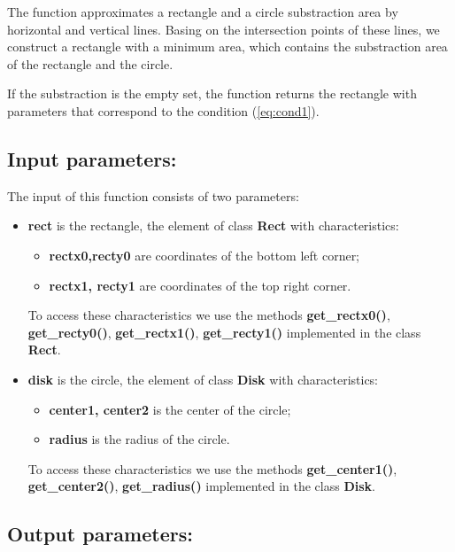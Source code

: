 \documentclass{report}
\begin{document}
The function approximates a rectangle and a circle substraction area by horizontal and vertical lines. Basing on the intersection points of these lines, we construct a rectangle with a minimum area, which contains the substraction area of the rectangle and the circle.

If the substraction is the empty set, the function returns the rectangle with parameters that correspond to the condition (\ref{eq:cond1}).

\subsection*{Input parameters:}

The input of this function consists of two parameters:

\begin{itemize}
	\item {\bfseries	rect} is the rectangle, the element of class {\bfseries Rect} with characteristics:
	\begin{itemize}
		\item {\bfseries rectx0,recty0} are coordinates of the bottom left corner;
		\item {\bfseries rectx1, recty1} are coordinates of the top right corner.
	\end{itemize}
	
	To access these characteristics we use the methods  {\bfseries get\_rectx0()}, {\bfseries get\_recty0()}, {\bfseries get\_rectx1()}, {\bfseries get\_recty1()} implemented in the class {\bfseries Rect}.
	
	\item {\bfseries disk}  is the circle, the element of class {\bfseries Disk} with characteristics:
	\begin{itemize}
		\item {\bfseries center1, center2}  is the center of the circle;
		\item {\bfseries radius}  is  the radius of the circle.
	\end{itemize}
	
	To access these characteristics we use the methods {\bfseries get\_center1()}, {\bfseries get\_center2()}, {\bfseries get\_radius()} implemented in the class {\bfseries Disk}.
\end{itemize}

\subsection*{Output parameters:}
\end{document}
